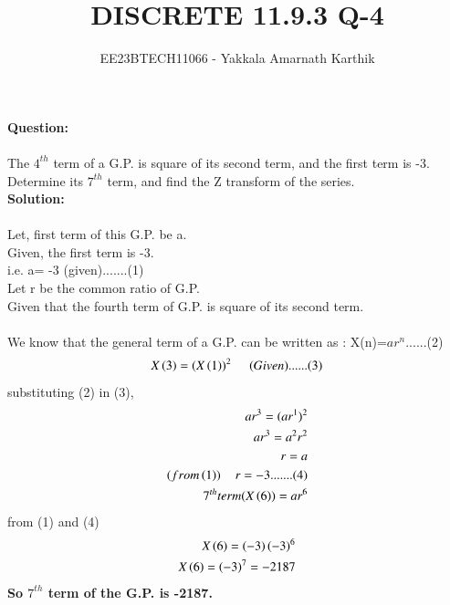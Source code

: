 \documentclass[journal,12pt,twocolumn]{IEEEtran}
\begin{document}


\title{DISCRETE 11.9.3 Q-4}
\author{EE23BTECH11066 - Yakkala Amarnath Karthik
}
\maketitle


\textbf{Question:} \\ \\The $4^{th}$ term of a G.P. is square of its second term, and the first term is -3. Determine its $7^{th}$ term, and find the Z transform of the series.\\

\textbf{Solution:} \\ \\
Let, first term of this G.P. be a.
\\Given, the first term is -3.\\ i.e. a= -3 (given).......(1) \\ 
Let r be the common ratio of G.P.\\
Given that the fourth term of G.P. is square of its second term.\\
\\We know that the general term of a G.P. can be written as : X(n)=$ar^{n}$......(2)
\begin{align}
 X\left(3\right)=(X\left(1\right))^2\hspace{0.5cm}(Given)......(3) 
 \end{align}
 \hspace{3cm} substituting (2) in (3),
 \begin{align}
 ar^{3}=(ar^{1})^2\\
ar^3=a^2r^2\\
r=a\\
(from\left(1\right))\hspace{0.4cm}r=-3.......(4)\\
\text7^{th} term(X\left(6\right))=ar^{6}
\end{align}
\hspace{3cm} from (1) and (4)
\begin{align}
X\left(6\right)=\left(-3\right)\left(-3\right)^6\\
X\left(6\right)=\left(-3\right)^7=-2187
\end{align}
\textbf{So $7^{th}$ term of the G.P. is -2187.}\\
\bigskip
\\ \\ \\ \\ \\ \\ \\ \\ \\ \\ 
  
\end{document}
